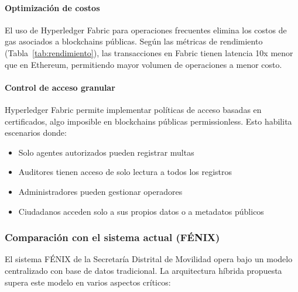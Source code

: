 \paragraph{Optimización de costos}
El uso de Hyperledger Fabric para operaciones frecuentes elimina los costos de gas asociados a blockchains públicas. Según las métricas de rendimiento (Tabla~\ref{tab:rendimiento}), las transacciones en Fabric tienen latencia 10x menor que en Ethereum, permitiendo mayor volumen de operaciones a menor costo.

\paragraph{Control de acceso granular}
Hyperledger Fabric permite implementar políticas de acceso basadas en certificados, algo imposible en blockchains públicas permissionless. Esto habilita escenarios donde:
\begin{itemize}
    \item Solo agentes autorizados pueden registrar multas
    \item Auditores tienen acceso de solo lectura a todos los registros
    \item Administradores pueden gestionar operadores
    \item Ciudadanos acceden solo a sus propios datos o a metadatos públicos
\end{itemize}

\subsubsection{Comparación con el sistema actual (FÉNIX)}

El sistema FÉNIX de la Secretaría Distrital de Movilidad opera bajo un modelo centralizado con base de datos tradicional. La arquitectura híbrida propuesta supera este modelo en varios aspectos críticos:

